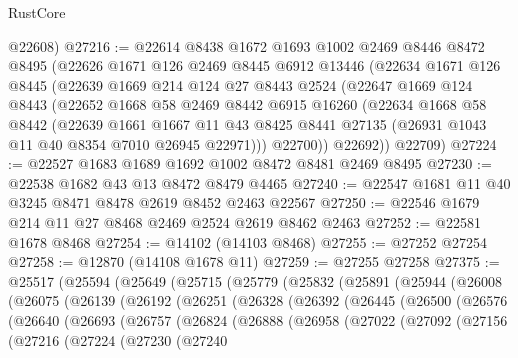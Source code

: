 \begin{lexlean}{RustCore}
\begin{coremodule}
      @22608)
@27216 := @22614
    @8438
    @1672
    @1693
    @1002
    @2469
    @8446
    @8472
    @8495
    (@22626
      @1671
      @126
      @2469
      @8445
      @6912
      @13446
      (@22634
        @1671
        @126
        @8445
        (@22639
          @1669
          @214
          @124
          @27
          @8443
          @2524
          (@22647
            @1669
            @124
            @8443
            (@22652
              @1668
              @58
              @2469
              @8442
              @6915
              @16260
              (@22634
                @1668
                @58
                @8442
                (@22639
                  @1661
                  @1667
                  @11
                  @43
                  @8425
                  @8441
                  @27135
                  (@26931 @1043 @11 @40 @8354 @7010 @26945 @22971)))
              @22700))
          @22692))
      @22709)
@27224 := @22527 @1683 @1689 @1692 @1002 @8472 @8481 @2469 @8495
@27230 := @22538 @1682 @43 @13 @8472 @8479 @4465
@27240 := @22547 @1681 @11 @40 @3245 @8471 @8478 @2619 @8452 @2463 @22567
@27250 := @22546 @1679 @214 @11 @27 @8468 @2469 @2524 @2619 @8462 @2463
@27252 := @22581 @1678 @8468
@27254 := @14102 (@14103 @8468)
@27255 := @27252 @27254
@27258 := @12870 (@14108 @1678 @11)
@27259 := @27255 @27258
@27375 := @25517
    (@25594
      (@25649
        (@25715
          (@25779
            (@25832
              (@25891
                (@25944
                  (@26008
                    (@26075
                      (@26139
                        (@26192
                          (@26251
                            (@26328
                              (@26392
                                (@26445
                                  (@26500
                                    (@26576
                                      (@26640
                                        (@26693
                                          (@26757
                                            (@26824
                                              (@26888
                                                (@26958
                                                  (@27022
                                                    (@27092
                                                      (@27156
                                                        (@27216
                                                          (@27224
                                                            (@27230
                                                              (@27240

\end{coremodule}
\end{lexlean}
